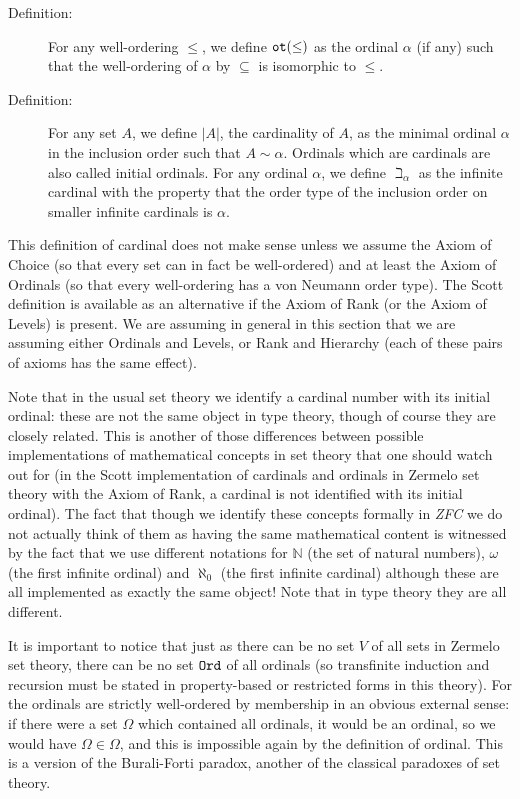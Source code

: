 \documentclass[12pt]{book}
\begin{document}
\begin{description}
\item[Definition:] For any well-ordering $\leq$, we define
${\tt ot}(\leq)$ as the ordinal $\alpha$ (if any) such that the
well-ordering of $\alpha$ by $\subseteq$ is isomorphic to $\leq$.

\item[Definition:] For any set $A$, we define $|A|$, the cardinality of $A$,  as the minimal
ordinal $\alpha$ in the inclusion order such that $A \sim \alpha$.  Ordinals which are cardinals are also called initial ordinals.  For any ordinal $\alpha$, we define $\beth_{\alpha}$ as the infinite cardinal with the property that the order type of the inclusion order on smaller infinite cardinals is $\alpha$.
\end{description}

This definition of cardinal does not make sense unless we assume the 
Axiom of Choice (so that every set can in fact be well-ordered) and at least
the Axiom of Ordinals (so that every well-ordering has a von Neumann order type).
The Scott definition is available as an alternative if the Axiom of Rank (or the Axiom of Levels) is present.  We are assuming in general in this section
that we are assuming either Ordinals and Levels, or Rank and Hierarchy (each of these pairs of axioms has the same effect).

Note that in the usual set theory we identify a cardinal number with
its initial ordinal: these are not the same object in type theory,
though of course they are closely related.  This is another of those
differences between possible implementations of mathematical concepts
in set theory that one should watch out for (in the Scott
implementation of cardinals and ordinals in Zermelo set theory with the Axiom of Rank, a
cardinal is not identified with its initial ordinal).  The fact that
though we identify these concepts formally in {\em ZFC\/} we do not
actually think of them as having the same mathematical content is
witnessed by the fact that we use different notations for $\mathbb N$
(the set of natural numbers), $\omega$ (the first infinite ordinal)
and $\aleph_0$ (the first infinite cardinal) although these are all
implemented as exactly the same object!  Note that in type theory they
are all different.

It is important to notice that just as there can be no set $V$ of all
sets in Zermelo set theory, there can be no set ${\tt Ord}$ of all
ordinals (so transfinite induction and recursion must be stated in
property-based or restricted forms in this theory).  For the ordinals
are strictly well-ordered by membership in an obvious external sense:
if there were a set $\Omega$ which contained all ordinals, it would be
an ordinal, so we would have $\Omega \in \Omega$, and this is
impossible again by the definition of ordinal.  This is a version of
the Burali-Forti paradox, another of the classical paradoxes of set
theory.
\end{document}
